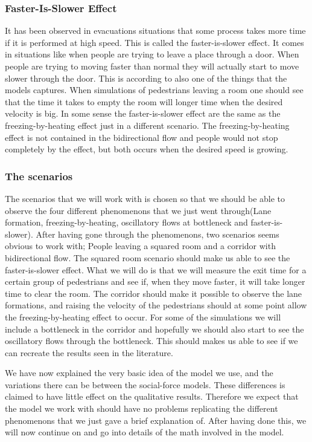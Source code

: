 \subsubsection{Faster-Is-Slower Effect}
It has been observed in evacuations situations that some process takes more 
time if it is performed at high speed. This is called the faster-is-slower effect. It comes in situations like when people are trying to leave a place through a door. When people are trying to moving faster than normal they will actually start to move slower through the door. This is according to \cite{self-org} also one of the things that the models captures. When simulations of pedestrians leaving a room one should see that the time it takes to empty the room will longer time when the desired velocity is big.  In some sense the faster-is-slower effect are the same as the freezing-by-heating effect just in a different scenario. The freezing-by-heating effect is not contained in the bidirectional flow and people would not stop completely by the effect, but both occurs when the desired speed is growing. 

\subsubsection{The scenarios}
The scenarios that we will work with is chosen so that we should be able to observe the four different phenomenons that we just went through(Lane formation, freezing-by-heating, oscillatory flows at bottleneck and faster-is-slower). After having gone through the phenomenons, two scenarios seems obvious to work with; People leaving a squared room and a corridor with bidirectional flow. The squared room scenario should make us able to see the faster-is-slower effect. What we will do is that we will measure the exit time for a certain group of pedestrians and see if, when they move faster, it will take longer time to clear the room. The corridor should make it possible to observe the lane formations, and raising the velocity of the pedestrians should at some point allow the freezing-by-heating effect to occur. For some of the simulations we will include a bottleneck in the corridor and hopefully we should also start to see the oscillatory flows through the bottleneck.
This should makes us able to see if we can recreate the results seen in the literature.   


 We have now explained the very basic idea of the model we use, and the variations there can be between the social-force models. These differences is claimed to have little effect on the qualitative results. Therefore we expect that the model we work with should have no problems replicating the different phenomenons that we just gave a brief explanation of. After having done this, we will now continue on and go into details of the math involved in the model. 

